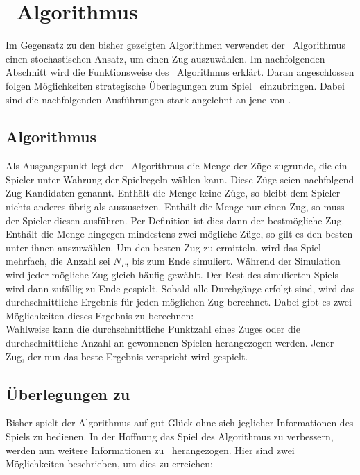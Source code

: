 \section{\mc\ Algorithmus}
\authormax
\label{mc_algo}
Im Gegensatz zu den bisher gezeigten Algorithmen verwendet der \mc\ Algorithmus einen stochastischen Ansatz, um einen Zug auszuwählen. Im nachfolgenden Abschnitt wird die Funktionsweise des \mc\ Algorithmus erklärt. Daran angeschlossen folgen Möglichkeiten strategische Überlegungen zum Spiel \ot\ einzubringen. Dabei sind die nachfolgenden Ausführungen stark angelehnt an jene von \cite{nijssen_2007}.
\subsection{Algorithmus}
Als Ausgangspunkt legt der \mc\ Algorithmus die Menge der Züge zugrunde, die ein Spieler unter Wahrung der Spielregeln wählen kann. Diese Züge seien nachfolgend Zug-Kandidaten genannt. Enthält die Menge keine Züge, so bleibt dem Spieler nichts anderes übrig als auszusetzen. Enthält die Menge nur einen Zug, so muss der Spieler diesen ausführen. Per Definition ist dies dann der bestmögliche Zug. Enthält die Menge hingegen mindestens zwei mögliche Züge, so gilt es den besten unter ihnen auszuwählen. Um den besten Zug zu ermitteln, wird das Spiel mehrfach, die Anzahl sei $N_{P}$, bis zum Ende simuliert. Während der Simulation wird jeder mögliche Zug gleich häufig gewählt. Der Rest des simulierten Spiels wird dann zufällig zu Ende gespielt. Sobald alle Durchgänge erfolgt sind, wird das durchschnittliche Ergebnis für jeden möglichen Zug berechnet. Dabei gibt es zwei Möglichkeiten dieses Ergebnis zu berechnen:\\
Wahlweise kann die durchschnittliche Punktzahl eines Zuges oder die durchschnittliche Anzahl an gewonnenen Spielen herangezogen werden. Jener Zug, der nun das beste Ergebnis verspricht wird gespielt.
\subsection{Überlegungen zu \ot}
Bisher spielt der Algorithmus auf gut Glück ohne sich jeglicher Informationen des Spiels zu bedienen. In der Hoffnung das Spiel des Algorithmus zu verbessern, werden nun weitere Informationen zu \ot\ herangezogen. Hier sind zwei Möglichkeiten beschrieben, um dies zu erreichen:
